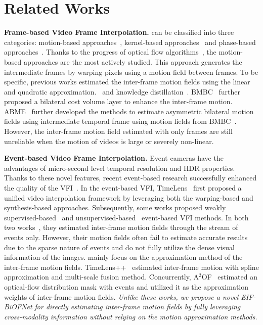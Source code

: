 \section{Related Works}
\vspace{-2pt}
\label{sec:Related_works}
\noindent\textbf{Frame-based Video Frame Interpolation.} can be classified into three categories: motion-based approaches~\cite{DAIN,BMBC,ABME,bao2019memc,vfiformer,superslowmo,gui2020featureflow,hu2022many,Danier_2022_CVPR,niklaus2020softmax}, kernel-based approaches~\cite{DAIN,bao2019memc,sepconv,lee2020adacof,cheng2020video,shi2022video} and phase-based approaches~\cite{meyer2015phase,meyer2018phasenet}.
Thanks to the progress of optical flow algorithms~\cite{teed2020raft,Sun2018PWC-Net}, the motion-based approaches are the most actively studied.
This approach generates the intermediate frames by warping pixels using a motion field between frames. 
To be specific, previous works estimated the inter-frame motion fields using the linear~\cite{DAIN,superslowmo,BMBC}  and quadratic approximation.~\cite{qvi,liu2020enhanced} and knowledge distillation~\cite{RIFE,IFRNet}.
BMBC~\cite{BMBC} further proposed a bilateral cost volume layer to enhance the inter-frame motion.
ABME~\cite{ABME} further developed the methods to estimate asymmetric bilateral motion fields using intermediate temporal frame using motion fields from BMBC~\cite{BMBC}.
However, the inter-frame motion field estimated with only frames are still unreliable when the motion of videos is large or severely non-linear.

\noindent\textbf{Event-based Video Frame Interpolation.} Event cameras have the advantages of micro-second level temporal resolution and HDR properties.
Thanks to these novel features, recent event-based research successfully enhanced the quality of the VFI~\cite{kim2021event,Shang_2021_ICCV,sun2022event,ledvdi,xu2021motion,Zhang_2022_CVPR,Song_2022_CVPR}.
In the event-based VFI, TimeLens~\cite{timelens} first proposed a unified video interpolation framework by leveraging both the warping-based and synthesis-based approaches.
Subsequently, some works proposed weakly supervised-based~\cite{wevi} and unsupervised-based~\cite{timereplayer} event-based VFI methods.
In both two works~\cite{timelens,timereplayer}, they estimated inter-frame motion fields through the stream of events only.
However, their motion fields often fail to estimate accurate results due to the sparse nature of events and do not fully utilize the dense visual information of the images.
\cite{timelens++,a2of} mainly focus on the approximation method of the inter-frame motion fields. 
TimeLens++~\cite{timelens++} estimated inter-frame motion with spline approximation and multi-scale fusion method.
Concurrently, A$^2$OF~\cite{a2of} estimated an optical-flow distribution mask with events and utilized it as the approximation weights of inter-frame motion fields.
\textit{Unlike these works, we propose a novel EIF-BiOFNet for directly estimating inter-frame motion fields by fully leveraging cross-modality information without relying on the motion approximation methods.}


